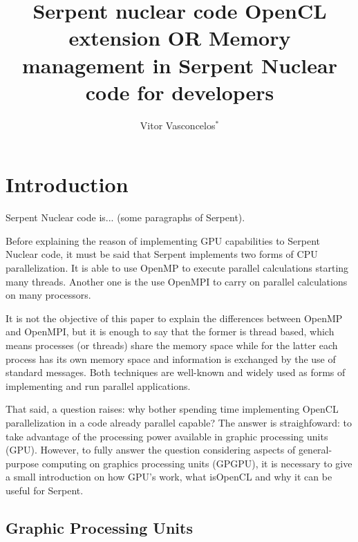 \documentclass[twoside,a4paper,12pt,english,draft]{anstrans}
\title{Serpent nuclear code OpenCL extension OR Memory management in Serpent Nuclear code
for developers}
\author{Vitor Vasconcelos$^{*}$}
\institute{
  $^{*}$Centro de Desenvolvimento da Tecnologia Nuclear - CDTN, Comiss\~ao Nacional de Energia Nuclear - CNEN,
  Av. Presidente Ant\^onio Carlos 6627, CEP 31270-901, Belo Horizonte - MG, Brazil
}
\begin{document}
\vspace*{-42pt}
\begin{strip}
\vspace*{14pt}
\end{strip}


\section{Introduction}


Serpent Nuclear code is... (some paragraphs of Serpent).



Before explaining the reason of implementing GPU capabilities to Serpent Nuclear code,
it must be said that Serpent implements two forms of CPU parallelization. It is able to use
OpenMP\cite{Dagum1998} to execute parallel calculations starting many threads. Another one
is the use OpenMPI\cite{openmpi2004} to carry on parallel calculations on many processors.

It is not the objective of this paper
to explain the differences between OpenMP and OpenMPI, but it is enough to say that the former
is thread based, which means processes (or threads) share the memory space while for the latter
each process has its own memory space and information is exchanged by the use of standard messages.
Both techniques are well-known and widely used as forms of implementing and run parallel applications.

That said, a question raises: why bother spending time implementing OpenCL parallelization
in a code already parallel capable? The answer is straighfoward: to take
advantage of the processing power available in graphic processing units (GPU).
However, to fully answer the question considering aspects of general-purpose computing on graphics
processing units (GPGPU), it is necessary to give a small introduction on how GPU's work, what isOpenCL and why
it can be useful for Serpent.

\subsection{Graphic Processing Units}
\end{document}
